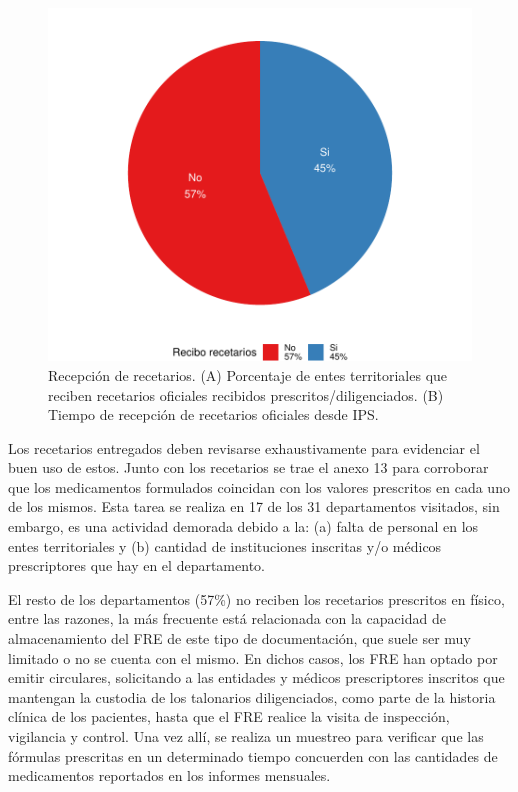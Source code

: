 \documentclass[
]{book}
\begin{document}
\begin{figure}

{\centering \includegraphics[width=1\linewidth]{InformeFinal_files/figure-latex/ReciboRecetariosInstituciones-1} 

}

\caption{Recepción de recetarios. (A) Porcentaje de entes territoriales que reciben recetarios oficiales recibidos prescritos/diligenciados. (B) Tiempo de recepción de recetarios oficiales desde IPS.}\label{fig:ReciboRecetariosInstituciones}
\end{figure}

Los recetarios entregados deben revisarse exhaustivamente para evidenciar el buen uso de estos. Junto con los recetarios se trae el anexo 13 para corroborar que los medicamentos formulados coincidan con los valores prescritos en cada uno de los mismos. Esta tarea se realiza en 17 de los 31 departamentos visitados, sin embargo, es una actividad demorada debido a la: (a) falta de personal en los entes territoriales y (b) cantidad de instituciones inscritas y/o médicos prescriptores que hay en el departamento.

El resto de los departamentos (57\%) no reciben los recetarios prescritos en físico, entre las razones, la más frecuente está relacionada con la capacidad de almacenamiento del FRE de este tipo de documentación, que suele ser muy limitado o no se cuenta con el mismo. En dichos casos, los FRE han optado por emitir circulares, solicitando a las entidades y médicos prescriptores inscritos que mantengan la custodia de los talonarios diligenciados, como parte de la historia clínica de los pacientes, hasta que el FRE realice la visita de inspección, vigilancia y control. Una vez allí, se realiza un muestreo para verificar que las fórmulas prescritas en un determinado tiempo concuerden con las cantidades de medicamentos reportados en los informes mensuales.
\end{document}
